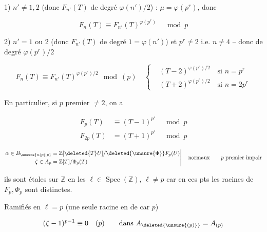 1) $n'\ne1,2$ (donc $F_{n'}(T)$ de degré $\varphi(n')/2$) : $\mu=\varphi(p^r)$, donc

\[
F_n(T)\equiv F_{n'}(T)^{\varphi(p^r)}\quad\bmod p
\]

2) $n'=1$ ou 2 (donc $F_{n'}(T)$ de degré $1=\varphi(n')$)  et $p^r\ne2$ i.e. $n\ne4$ -- donc   de degré $\varphi(p^r)/2$


\[
F_n(T)\equiv F_{n'}(T)^{\varphi(p^r)/2}\ \bmod(p)\quad
\left\{\begin{aligned}
&(T-2)^{\varphi(p^r)/2}\quad\text{si }n=p^r\\
&(T+2)^{\varphi(p^r)/2}\quad\text{si }n=2p^r
\end{aligned}\right.
\]



En particulier, si $p$ premier $\ne2$, on a

\[
\begin{aligned}
F_p(T)&\equiv(T-1)^{p'}\quad\bmod p\\
F_{2p}(T)&=(T+1)^{p'}\quad\bmod p
\end{aligned}
\]




\[
\left.\begin{aligned}
\alpha\in B_{\unsure{n(p)|p}}&=\mathbb Z[\deleted{T}U]/\deleted{\unsure{\Phi}}F_p(U)\\
\zeta\in A_p&=\mathbb Z[T]/\Phi_p(T)
\end{aligned}\right|\quad\text{normaux}\qquad p\text{ premier impair}
\]

ils sont étales sur $\mathbb Z$ en les  $\ell\in\operatorname{Spec}(\mathbb Z)$, $\ell\ne p$ car en ces pts les racines de $F_p,\Phi_p$ sont distinctes.

Ramifiés en $\ell=p$ (une seule racine en  de car $p$)

\[
(\zeta-1)^{p-1}\equiv0\quad(p)\qquad\text{dans }A_{\deleted{\unsure{(p)}}}=A_{(p)}
\]

